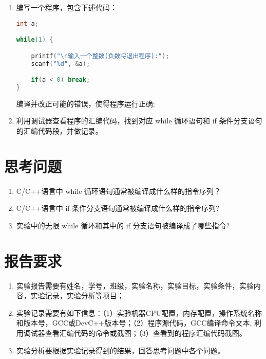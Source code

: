 \begin{enumerate}
	\item 编写一个程序，包含下述代码：
\begin{lstlisting}[language={C++}]
int a;

while(1) {

    printf("\n输入一个整数(负数将退出程序):");
    scanf("%d", &a);

    if(a < 0) break;
}
\end{lstlisting}

	编译并改正可能的错误，使得程序运行正确;

	\item 利用调试器查看程序的汇编代码，找到对应 while 循环语句和 if 条件分支语句的汇编代码段，并做记录。
\end{enumerate}

\section{思考问题}

\begin{enumerate}
	\item C/C++语言中 while 循环语句通常被编译成什么样的指令序列？
	\item C/C++语言中 if 条件分支语句通常被编译成什么样的指令序列?
	\item 实验中的无限 while 循环和其中的 if 分支语句被编译成了哪些指令?
\end{enumerate}

\section{报告要求}

\begin{enumerate}
	\item 实验报告需要有姓名，学号，班级，实验名称，实验目标，实验条件，实验内容，实验记录，实验分析等项目；
	\item 实验记录需要有如下信息：（1）实验机器CPU配置，内存配置，操作系统名称和版本号，GCC或DevC++版本号；（2）程序源代码，GCC编译命令文本, 利用调试器查看汇编代码的命令或截图；（3）查看到的程序汇编代码截图。
	\item 实验分析要根据实验记录得到的结果，回答思考问题中各个问题。
\end{enumerate}

